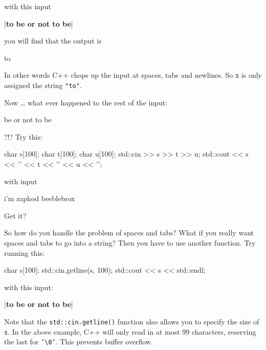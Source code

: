 with this input

\begin{consolethree}[escapeinside=||]
|\textbf{to be or not to be}|
\end{consolethree}

you will find that the output is

\begin{console}
to
\end{console}

In other words C++ chops up the input at spaces, tabs and newlines. So \texttt{s} is only assigned the string \texttt{"to"}.

Now \ldots{} what ever happened to the rest of the input:

\begin{console}
be or not to be
\end{console}

?!? Try this:

\begin{consolethree}[escapeinside=||]
char s[100];
char t[100];
char u[100];
std::cin >> s >> t >> u;
std::cout << s << '\n' << t << '\n' << u << '\n';
\end{consolethree}

with input

\begin{consolethree}[escapeinside=||]
i'm zaphod beeblebrox
\end{consolethree}

Get it?


So how do you handle the problem of spaces and tabs? What if you really want spaces and tabs to go into a string? Then you have to use another function. Try running this:

\begin{consolethree}[escapeinside=||]
char s[100];
std::cin.getline(s, 100);
std::cout << s << std::endl;
\end{consolethree}

with this input:

\begin{consolethree}[escapeinside=||]
|\textbf{to be or not to be}|
\end{consolethree}

Note that the \texttt{std::cin.getline()} function also allows you to specify the size of \texttt{s}. In the above example, C++ will only read in at most 99 characters, reserving the last for \texttt{'\textbackslash 0'}. This prevents buffer overflow.

